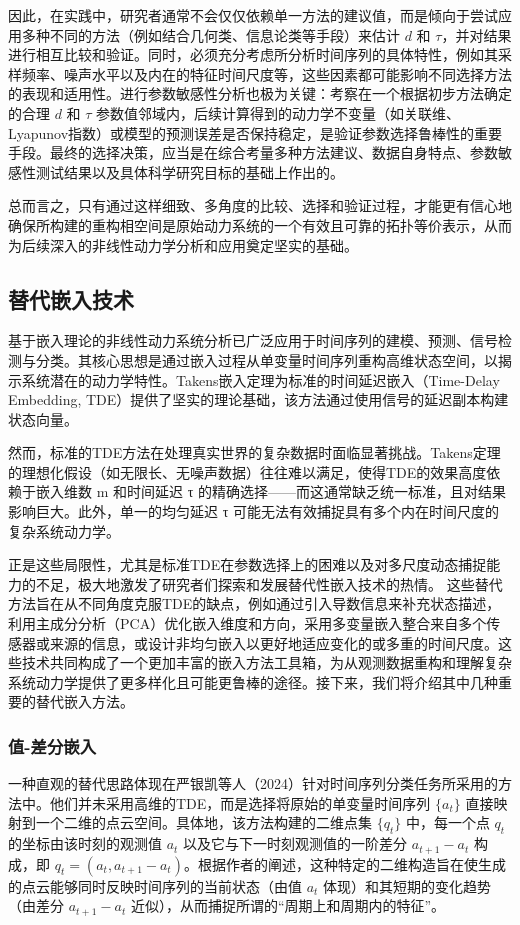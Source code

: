因此，在实践中，研究者通常不会仅仅依赖单一方法的建议值，而是倾向于尝试应用多种不同的方法（例如结合几何类、信息论类等手段）来估计 $d$ 和 $\tau$，并对结果进行相互比较和验证。同时，必须充分考虑所分析时间序列的具体特性，例如其采样频率、噪声水平以及内在的特征时间尺度等，这些因素都可能影响不同选择方法的表现和适用性。进行参数敏感性分析也极为关键：考察在一个根据初步方法确定的合理 $d$ 和 $\tau$ 参数值邻域内，后续计算得到的动力学不变量（如关联维、Lyapunov指数）或模型的预测误差是否保持稳定，是验证参数选择鲁棒性的重要手段。最终的选择决策，应当是在综合考量多种方法建议、数据自身特点、参数敏感性测试结果以及具体科学研究目标的基础上作出的。

总而言之，只有通过这样细致、多角度的比较、选择和验证过程，才能更有信心地确保所构建的重构相空间是原始动力系统的一个有效且可靠的拓扑等价表示，从而为后续深入的非线性动力学分析和应用奠定坚实的基础。



\subsection{替代嵌入技术}
基于嵌入理论的非线性动力系统分析已广泛应用于时间序列的建模、预测、信号检测与分类。其核心思想是通过嵌入过程从单变量时间序列重构高维状态空间，以揭示系统潜在的动力学特性。Takens嵌入定理为标准的时间延迟嵌入（Time-Delay Embedding, TDE）提供了坚实的理论基础，该方法通过使用信号的延迟副本构建状态向量。

然而，标准的TDE方法在处理真实世界的复杂数据时面临显著挑战。Takens定理的理想化假设（如无限长、无噪声数据）往往难以满足，使得TDE的效果高度依赖于嵌入维数 m 和时间延迟 τ 的精确选择——而这通常缺乏统一标准，且对结果影响巨大。此外，单一的均匀延迟 τ 可能无法有效捕捉具有多个内在时间尺度的复杂系统动力学。

正是这些局限性，尤其是标准TDE在参数选择上的困难以及对多尺度动态捕捉能力的不足，极大地激发了研究者们探索和发展替代性嵌入技术的热情。 这些替代方法旨在从不同角度克服TDE的缺点，例如通过引入导数信息来补充状态描述，利用主成分分析（PCA）优化嵌入维度和方向，采用多变量嵌入整合来自多个传感器或来源的信息，或设计非均匀嵌入以更好地适应变化的或多重的时间尺度。这些技术共同构成了一个更加丰富的嵌入方法工具箱，为从观测数据重构和理解复杂系统动力学提供了更多样化且可能更鲁棒的途径。接下来，我们将介绍其中几种重要的替代嵌入方法。
\subsubsection{值-差分嵌入}
一种直观的替代思路体现在严银凯等人（2024）针对时间序列分类任务所采用的方法中。他们并未采用高维的TDE，而是选择将原始的单变量时间序列 $\{a_t\}$ 直接映射到一个二维的点云空间。具体地，该方法构建的二维点集 $\{q_t\}$ 中，每一个点 $q_t$ 的坐标由该时刻的观测值 $a_t$ 以及它与下一时刻观测值的一阶差分 $a_{t+1}-a_t$ 构成，即 $q_t = (a_t, a_{t+1}-a_t)$。根据作者的阐述，这种特定的二维构造旨在使生成的点云能够同时反映时间序列的当前状态（由值 $a_t$ 体现）和其短期的变化趋势（由差分 $a_{t+1}-a_t$ 近似），从而捕捉所谓的“周期上和周期内的特征”。


